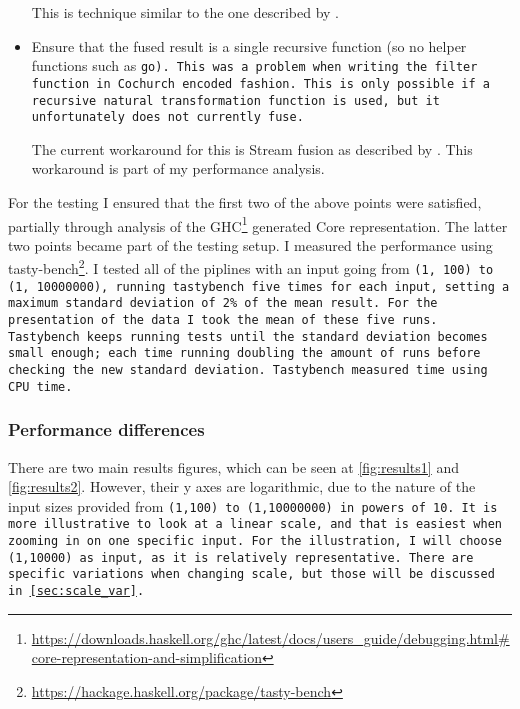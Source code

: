 \begin{itemize}[noitemsep]
This is technique similar to the one described by \cite{Breitner2018}.
\item Ensure that the fused result is a single recursive function (so no helper functions such as \tt{go}).
This was a problem when writing the filter function in Cochurch encoded fashion.
This is only possible if a recursive natural transformation function is used, but it unfortunately does not currently fuse.

The current workaround for this is Stream fusion as described by \cite{Coutts2007}.
This workaround is part of my performance analysis.

\end{itemize}


For the testing I ensured that the first two of the above points were satisfied, partially through analysis of the GHC\footnote{\url{https://downloads.haskell.org/ghc/latest/docs/users_guide/debugging.html\#core-representation-and-simplification}} generated Core representation.
The latter two points became part of the testing setup.
I measured the performance using tasty-bench\footnote{\url{https://hackage.haskell.org/package/tasty-bench}}.
I tested all of the piplines with an input going from \tt{(1, 100)} to \tt{(1, 10000000)},
running tastybench five times for each input, setting a maximum standard deviation of 2\% of the mean result.
For the presentation of the data I took the mean of these five runs.
Tastybench keeps running tests until the standard deviation becomes small enough; each time running doubling the amount of runs before checking the new standard deviation.
Tastybench measured time using CPU time.

\subsubsection{Performance differences}
There are two main results figures, which can be seen at \autoref{fig:results1} and \autoref{fig:results2}.
However, their y axes are logarithmic, due to the nature of the input sizes provided from \tt{(1,100)} to \tt{(1,10000000)} in powers of 10.
It is more illustrative to look at a linear scale, and that is easiest when zooming in on one specific input.
For the illustration, I will choose \tt{(1,10000)} as input, as it is relatively representative.
There are specific variations when changing scale, but those will be discussed in \autoref{sec:scale_var}.

